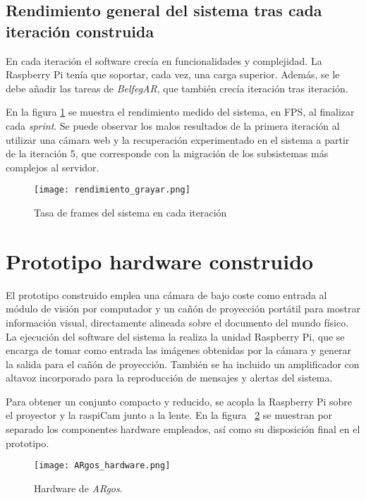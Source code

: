 \subsection{Rendimiento general del sistema tras cada iteración construida}
En cada iteración el software crecía en funcionalidades y complejidad. La Raspberry Pi tenía que soportar, cada vez, una carga superior. Además, se le debe añadir las tareas de \textit{BelfegAR}, que también crecía iteración tras iteración.

En la figura \ref{fig:iteration_chart} se muestra el rendimiento medido del sistema, en FPS, al finalizar cada \textit{sprint}. Se puede observar los malos resultados de la primera iteración al utilizar una cámara web y la recuperación experimentado en el sistema a partir de la iteración 5, que corresponde con la migración de los subsistemas más complejos al servidor.

\begin{figure}
 \begin{center}
    \texttt{[image: rendimiento\_grayar.png]}
    \caption{Tasa de frames del sistema en cada iteración}
    \label{fig:iteration_chart}
  \end{center}
\end{figure}

\section{Prototipo hardware construido}
El prototipo construido emplea una cámara de bajo coste como entrada al módulo de visión por computador y un cañón de proyección portátil para mostrar información visual, directamente alineada sobre el documento del mundo físico. La ejecución del software del sistema la realiza la unidad Raspberry Pi, que se encarga de tomar como entrada las imágenes obtenidas por la cámara y generar la salida para el cañón de proyección. También se ha incluido un amplificador con altavoz incorporado para la reproducción de mensajes y alertas del sistema.

Para obtener un conjunto compacto y reducido, se acopla la Raspberry Pi sobre el proyector y la raspiCam junto a la lente. En la figura ~\ref{fig:ARgos_hardware} se muestran por separado los componentes hardware empleados, así como su disposición final en el prototipo.

\begin{figure}
  \begin{center}
    \texttt{[image: ARgos\_hardware.png]}
    \caption{Hardware de \textit{ARgos}.}
    \label{fig:ARgos_hardware}
  \end{center}
\end{figure}

